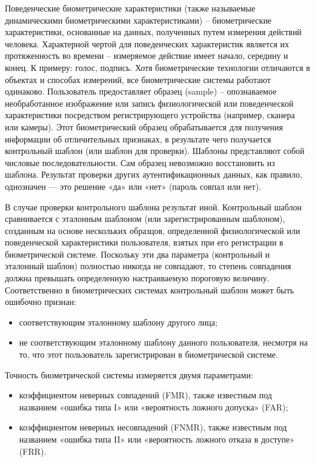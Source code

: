 Поведенческие биометрические характеристики (также называемые динамическими
биометрическими характеристиками) -- биометрические характеристики, основанные
на данных, полученных путем измерения действий человека.
Характерной чертой для поведенческих характеристик является их протяженность во
времени -- измеряемое действие имеет начало, середину и конец. К примеру: голос,
подпись. Хотя биометрические технологии отличаются в объектах и способах
измерений, все биометрические системы работают одинаково. Пользователь
предоставляет образец (sample) -- опознаваемое необработанное изображение или
запись физиологической или поведенческой характеристики посредством
регистрирующего устройства (например, сканера или камеры). Этот биометрический
образец обрабатывается для получения информации об отличительных признаках, в
результате чего получается контрольный шаблон (или шаблон для проверки). Шаблоны
представляют собой числовые последовательности. Сам образец невозможно
восстановить из шаблона. Результат проверки других аутентификационных данных,
как правило, однозначен --- это решение «да» или «нет» (пароль совпал или нет).

В случае проверки контрольного шаблона результат иной. Контрольный шаблон
сравнивается с эталонным шаблоном (или зарегистрированным шаблоном), созданным
на основе нескольких образцов, определенной физиологической или поведенческой
характеристики пользователя, взятых при его регистрации в биометрической
системе. Поскольку эти два параметра (контрольный и эталонный шаблон) полностью
никогда не совпадают, то степень совпадения должна превышать определенную
настраиваемую пороговую величину. Соответственно в биометрических системах
контрольный шаблон может быть ошибочно признан:
\begin{itemize}
  \item соответствующим эталонному шаблону другого лица;
  \item не соответствующим эталонному шаблону данного
пользователя, несмотря на то, что этот пользователь зарегистрирован в
биометрической системе.
\end{itemize}

Точность биометрической системы измеряется двумя
параметрами:

\begin{itemize}
  \item коэффициентом неверных совпадений (FMR), также известным под названием «ошибка
типа I» или «вероятность ложного допуска» (FAR);
  \item коэффициентом неверных
несовпадений (FNMR), также известным под названием «ошибка типа II» или
«вероятность ложного отказа в доступе» (FRR).
\end{itemize}~\cite{auth_n_aut} 

